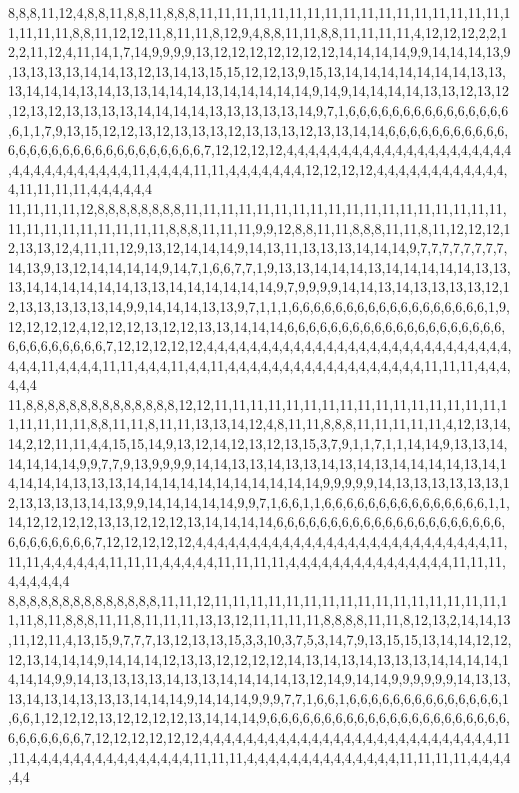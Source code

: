 8,8,8,11,12,4,8,8,11,8,8,11,8,8,8,11,11,11,11,11,11,11,11,11,11,11,11,11,11,11,11,11,11,11,11,11,8,8,11,12,12,11,8,11,11,8,12,9,4,8,8,11,11,8,8,11,11,11,11,4,12,12,12,2,2,12,2,11,12,4,11,14,1,7,14,9,9,9,9,13,12,12,12,12,12,12,12,14,14,14,14,9,9,14,14,14,13,9,13,13,13,13,14,14,13,12,13,14,13,15,15,12,12,13,9,15,13,14,14,14,14,14,14,14,13,13,13,14,14,14,13,14,13,13,14,14,14,13,14,14,14,14,14,9,14,9,14,14,14,14,13,13,12,13,12,12,13,12,13,13,13,13,14,14,14,14,13,13,13,13,13,14,9,7,1,6,6,6,6,6,6,6,6,6,6,6,6,6,6,6,6,1,1,7,9,13,15,12,12,13,12,13,13,13,12,13,13,13,12,13,13,14,14,6,6,6,6,6,6,6,6,6,6,6,6,6,6,6,6,6,6,6,6,6,6,6,6,6,6,6,6,6,7,12,12,12,12,4,4,4,4,4,4,4,4,4,4,4,4,4,4,4,4,4,4,4,4,4,4,4,4,4,4,4,4,4,4,4,4,11,4,4,4,4,11,11,4,4,4,4,4,4,4,12,12,12,12,4,4,4,4,4,4,4,4,4,4,4,4,4,11,11,11,11,4,4,4,4,4,4
11,11,11,11,12,8,8,8,8,8,8,8,8,11,11,11,11,11,11,11,11,11,11,11,11,11,11,11,11,11,11,11,11,11,11,11,11,11,11,11,8,8,8,11,11,11,9,9,12,8,8,11,11,8,8,8,11,11,8,11,12,12,12,12,13,13,12,4,11,11,12,9,13,12,14,14,14,9,14,13,11,13,13,13,14,14,14,9,7,7,7,7,7,7,7,7,14,13,9,13,12,14,14,14,14,9,14,7,1,6,6,7,7,1,9,13,13,14,14,14,13,14,14,14,14,14,13,13,13,14,14,14,14,14,14,13,13,14,14,14,14,14,14,9,7,9,9,9,9,14,14,13,14,13,13,13,13,12,12,13,13,13,13,13,14,9,9,14,14,14,13,13,9,7,1,1,1,6,6,6,6,6,6,6,6,6,6,6,6,6,6,6,6,6,6,1,9,12,12,12,12,4,12,12,12,13,12,12,13,13,14,14,14,6,6,6,6,6,6,6,6,6,6,6,6,6,6,6,6,6,6,6,6,6,6,6,6,6,6,6,6,6,7,12,12,12,12,12,4,4,4,4,4,4,4,4,4,4,4,4,4,4,4,4,4,4,4,4,4,4,4,4,4,4,4,4,4,4,4,11,4,4,4,4,11,11,4,4,4,11,4,4,11,4,4,4,4,4,4,4,4,4,4,4,4,4,4,4,4,4,4,11,11,11,4,4,4,4,4,4
11,8,8,8,8,8,8,8,8,8,8,8,8,8,8,12,12,11,11,11,11,11,11,11,11,11,11,11,11,11,11,11,11,11,11,11,11,11,8,8,11,11,8,11,11,13,13,14,12,4,8,11,11,8,8,8,11,11,11,11,11,4,12,13,14,14,2,12,11,11,4,4,15,15,14,9,13,12,14,12,13,12,13,15,3,7,9,1,1,7,1,1,14,14,9,13,13,14,14,14,14,14,9,9,7,7,9,13,9,9,9,9,14,14,13,13,14,13,13,14,13,14,13,14,14,14,14,13,14,14,14,14,14,13,13,13,14,14,14,14,14,14,14,14,14,14,14,9,9,9,9,9,14,13,13,13,13,13,13,12,13,13,13,13,14,13,9,9,14,14,14,14,14,9,9,7,1,6,6,1,1,6,6,6,6,6,6,6,6,6,6,6,6,6,6,6,1,1,14,12,12,12,12,13,13,12,12,12,13,14,14,14,14,6,6,6,6,6,6,6,6,6,6,6,6,6,6,6,6,6,6,6,6,6,6,6,6,6,6,6,6,6,7,12,12,12,12,12,4,4,4,4,4,4,4,4,4,4,4,4,4,4,4,4,4,4,4,4,4,4,4,4,4,4,4,11,11,11,4,4,4,4,4,4,11,11,11,4,4,4,4,4,11,11,11,11,4,4,4,4,4,4,4,4,4,4,4,4,4,4,4,11,11,11,4,4,4,4,4,4
8,8,8,8,8,8,8,8,8,8,8,8,8,8,11,11,12,11,11,11,11,11,11,11,11,11,11,11,11,11,11,11,11,11,11,8,11,8,8,8,11,11,8,11,11,11,13,13,12,11,11,11,11,8,8,8,8,11,11,8,12,13,2,14,14,13,11,12,11,4,13,15,9,7,7,7,13,12,13,13,15,3,3,10,3,7,5,3,14,7,9,13,15,15,13,14,14,12,12,12,13,14,14,14,9,14,14,14,12,13,13,12,12,12,12,14,13,14,13,14,13,13,13,14,14,14,14,14,14,14,9,9,14,13,13,13,13,14,13,13,14,14,14,14,13,12,14,9,14,14,9,9,9,9,9,9,14,13,13,13,14,13,14,13,13,13,14,14,14,9,14,14,14,9,9,9,7,7,1,6,6,1,6,6,6,6,6,6,6,6,6,6,6,6,6,6,1,6,6,1,12,12,12,13,12,12,12,12,13,14,14,14,9,6,6,6,6,6,6,6,6,6,6,6,6,6,6,6,6,6,6,6,6,6,6,6,6,6,6,6,6,6,7,12,12,12,12,12,12,4,4,4,4,4,4,4,4,4,4,4,4,4,4,4,4,4,4,4,4,4,4,4,4,4,4,4,11,11,4,4,4,4,4,4,4,4,4,4,4,4,4,4,4,11,11,11,4,4,4,4,4,4,4,4,4,4,4,4,4,4,11,11,11,11,4,4,4,4,4,4
